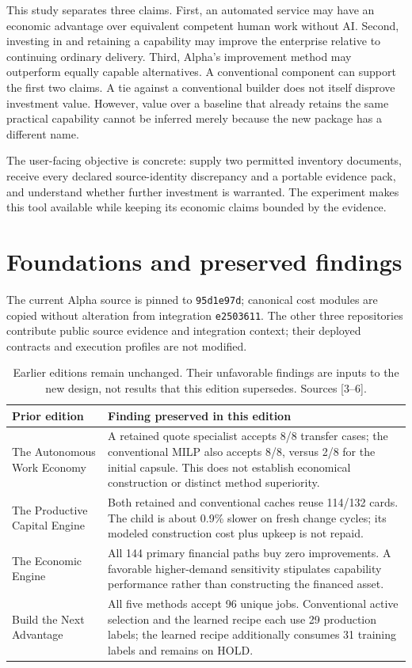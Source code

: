 \documentclass[11pt,a4paper]{article}
\newcommand{\code}[1]{\texttt{#1}}
\begin{document}
This study separates three claims. First, an automated service may have an economic
advantage over equivalent competent human work without AI. Second, investing in
and retaining a capability may improve the enterprise relative to continuing
ordinary delivery. Third, Alpha's improvement method may outperform equally
capable alternatives. A conventional component can support the first two claims.
A tie against a conventional builder does not itself disprove investment value.
However, value over a baseline that already retains the same practical capability
cannot be inferred merely because the new package has a different name.

The user-facing objective is concrete: supply two permitted inventory documents,
receive every declared source-identity discrepancy and a portable evidence pack,
and understand whether further investment is warranted. The experiment makes
this tool available while keeping its economic claims bounded by the evidence.

\section{Foundations and preserved findings}
The current Alpha source is pinned to \code{95d1e97d}; canonical cost modules are
copied without alteration from integration \code{e2503611}. The other three
repositories contribute public source evidence and integration context; their
deployed contracts and execution profiles are not modified.

\begin{table}[ht]\small\centering
\begin{tabularx}{\linewidth}{@{}>{\raggedright\arraybackslash}p{.26\linewidth}X@{}}\toprule
Prior edition & Finding preserved in this edition\\\midrule
The Autonomous Work Economy & A retained quote specialist accepts 8/8 transfer
cases; the conventional MILP also accepts 8/8, versus 2/8 for the initial capsule.
This does not establish economical construction or distinct method superiority.\\
The Productive Capital Engine & Both retained and conventional caches reuse
114/132 cards. The child is about 0.9\% slower on fresh change cycles; its modeled
construction cost plus upkeep is not repaid.\\
The Economic Engine & All 144 primary financial paths buy zero improvements.
A favorable higher-demand sensitivity stipulates capability performance rather
than constructing the financed asset.\\
Build the Next Advantage & All five methods accept 96 unique jobs. Conventional
active selection and the learned recipe each use 29 production labels; the
learned recipe additionally consumes 31 training labels and remains on HOLD.\\\bottomrule
\end{tabularx}
\caption{Earlier editions remain unchanged. Their unfavorable findings are inputs
to the new design, not results that this edition supersedes. Sources [3--6].}
\end{table}
\end{document}
